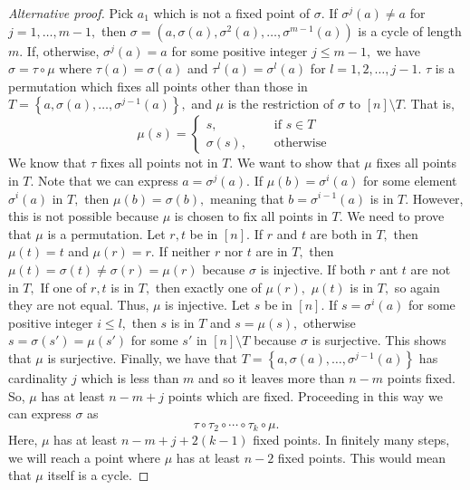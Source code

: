 \begin{proof}[Alternative proof]
Pick $a_1$ which is not a fixed point of $\sigma.$
If $\sigma^j(a) \not = a$ for $j = 1, \dotsc, m-1,$
then $\sigma = (a, \sigma(a), \sigma^2(a), \dotsc, \sigma^{m-1}(a) )$
is a cycle of length $m.$
If, otherwise, $\sigma^j(a) = a$ for some positive integer $j \leq m-1,$
we have $\sigma = \tau \circ \mu$ 
where $\tau(a) = \sigma(a)$ and $\tau^l(a) = \sigma^l(a)$
for $l = 1, 2, \dotsc, j-1.$ $\tau$
is a permutation which fixes all points other than those in
$T = \left\{ a, \sigma(a), \dotsc , \sigma^{j-1}(a) \right\},$
and $\mu$ is the restriction of $\sigma$ to 
$\left[ n \right]  \setminus T.$
That is,
$$\mu(s) = \begin{cases}
	s, \quad & \text{ if } s \in T\\
	\sigma(s), \quad & \text{ otherwise }
\end{cases} $$
We know that $\tau$ fixes all points not in $T.$
We want to show that $\mu$ fixes all points in $T.$
Note that we can express $a = \sigma^j(a).$
If $\mu(b) = \sigma^i(a)$ for some element $\sigma^i(a)$ in $T,$
then $\mu(b) = \sigma(b),$ meaning that $b = \sigma^{i-1}(a) $ is in $T.$
However, this is not possible because $\mu$ is chosen to fix all points
in $T.$ We need to prove that $\mu$ is a permutation.
Let $r,t$ be in $\left[ n \right] .$ If $r$ and $t$ are both 
in $T,$ then $ \mu(t) = t $ and $ \mu(r) = r.$ If neither $r$ nor
$t$ are in $T,$ then $ \mu(t) = \sigma(t) \not = \sigma(r) = \mu(r)$ 
because $\sigma$ is injective.
If both $r$ ant $t$ are not in $T,$
If one of $r, t$ is in $T,$ then exactly one of 
$\mu(r),$ $\mu(t)$ is in $T,$ so again they are not equal.
Thus, $\mu$ is injective.
Let $s$ be in $\left[ n \right].$ If $s = \sigma^i(a)$ for some positive integer $i \leq l,$
then $s $ is in $T$ and $s = \mu(s),$ otherwise $ s = \sigma(s') = \mu(s') $ for some $s'$ in
$ \left[ n \right] \setminus T$ because $ \sigma$ is surjective.
This shows that $ \mu$ is surjective.
Finally, we have that $ T = \left\{ a, \sigma(a), \dotsc, \sigma^{j-1}(a) \right\} $
has cardinality $j$ which is less than $m$ 
and so it leaves more than $n-m$ points fixed.
So, $\mu$ has at least $n-m+j$ points which are fixed.
Proceeding in this way we can express $\sigma$ as 
$$ \tau \circ \tau_2 \circ \cdots \circ \tau_k \circ \mu.$$
Here, $\mu$ has at least $n-m + j + 2(k-1)$ fixed points.
In finitely many steps, we will reach a point where
$\mu$ has at least $n-2$ fixed points. This would mean 
that $\mu$ itself is a cycle.
\end{proof}

